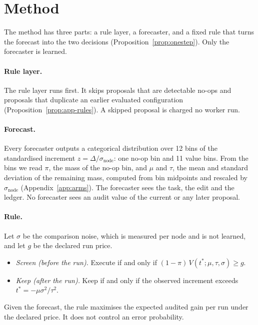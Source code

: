 \section{Method}
\label{sec:method}

The method has three parts: a rule layer, a forecaster, and a fixed rule that turns the forecast into the two decisions (Proposition~\ref{prop:onestep}). Only the forecaster is learned.

\paragraph{Rule layer.}
The rule layer runs first. It skips proposals that are detectable no-ops and proposals that duplicate an earlier evaluated configuration (Proposition~\ref{prop:app-rules}). A skipped proposal is charged no worker run.

\paragraph{Forecast.}
Every forecaster outputs a categorical distribution over 12 bins of the standardised increment $z=\Delta/\sigma_{\mathrm{node}}$: one no-op bin and 11 value bins. From the bins we read $\pi$, the mass of the no-op bin, and $\mu$ and $\tau$, the mean and standard deviation of the remaining mass, computed from bin midpoints and rescaled by $\sigma_{\mathrm{node}}$ (Appendix~\ref{app:arms}). The forecaster sees the task, the edit and the ledger. No forecaster sees an audit value of the current or any later proposal.

\paragraph{Rule.}
Let $\sigma$ be the comparison noise, which is measured per node and is not learned, and let $g$ be the declared run price.
\begin{itemize}
\item \emph{Screen (before the run).} Execute if and only if $(1-\pi)\,V(t^*;\mu,\tau,\sigma)\ge g$.
\item \emph{Keep (after the run).} Keep if and only if the observed increment exceeds $t^*=-\mu\sigma^2/\tau^2$.
\end{itemize}
Given the forecast, the rule maximises the expected audited gain per run under the declared price. It does not control an error probability.

